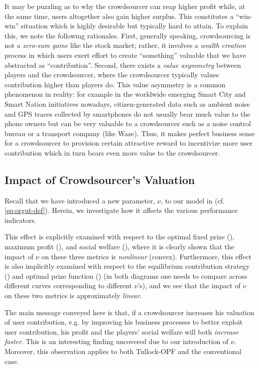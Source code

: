 \documentclass{sig-alternate-10pt}
\begin{document}
It may be puzzling as to why the crowdsourcer can reap higher profit while, at the same time, users altogether also gain higher surplus. This constitutes a ``win-win'' situation which is highly desirable but typically hard to attain. To explain this, we note the following rationales. First, generally speaking, crowdsourcing is not a {\em zero-sum game} like the stock market; rather, it involves a {\em wealth creation} process in which users exert effort to create ``something'' valuable that we have abstracted as ``contribution''. Second, there exists a {\em value asymmetry} between players and the crowdsourcer, where the crowdsourcer typically values contribution higher than players do. This value asymmetry is a common phenomenon in reality: for example in the worldwide emerging Smart City and Smart Nation initiatives nowadays, citizen-generated data such as ambient noise and GPS traces collected by smartphones do not usually bear much value to the phone owners but can be very valuable to a crowdsourcer such as a noise control bureau or a transport company (like Waze). Thus, it makes perfect business sense for a crowdsourcer to provision certain attractive reward to incentivize more user contribution which in turn bears even more value to the crowdsourcer.

\subsection{Impact of Crowdsourcer's Valuation}\label{sec:orgvalue}

Recall that we have introduced a new parameter, $\nu$, to our model in  (cf. \eqref{eq:orgut-def}). Herein, we investigate how it affects the various performance indicators.

This effect is explicitly examined with respect to the optimal fixed prize (), maximum profit (), and social welfare (), where it is clearly shown that the impact of $\nu$ on these three metrics is {\em nonlinear} (convex). Furthermore, this effect is also implicitly examined with respect to the equilibrium contribution strategy () and optimal prize function () (in both diagrams one needs to compare across different curves corresponding to different $\nu$'s),
and we see that the impact of $\nu$ on these two metrics is approximately {\em linear}. 

The main message conveyed here is that, if a crowdsourcer increases his valuation of user contribution, e.g. by improving his business processes to better exploit user contribution, his profit and the players' social welfare will both {\em increase faster}. This is an interesting finding uncovered due to our introduction of $\nu$. Moreover, this observation applies to both Tullock-OPF and the conventional case.
\end{document}
